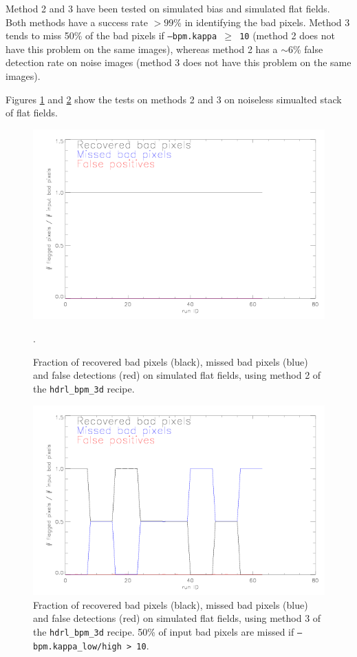 Method 2 and 3 have been tested on simulated bias and simulated flat
fields. Both methods have a success rate $> 99$\% in identifying the
bad pixels. Method 3 tends to miss 50\% of the bad pixels if
{\tt --bpm.kappa $\geq$ 10} (method 2 does not have this problem on
the same images), whereas method 2 has a $\sim 6$\% false detection
rate on noise images (method 3 does not have this problem on the same
images).

Figures \ref{fig:stack_m2} and \ref{fig:stack_m3} show the tests on
methods 2 and 3 on noiseless simualted stack of flat fields.


\begin{figure}
 \subfigure
\includegraphics[width=17cm]{figures/recovered_bad_pixels_3d_m2.png}
 \caption{Fraction of recovered bad pixels (black), missed bad pixels
   (blue) and false detections (red) on simulated flat fields, using method 2 of the {\tt hdrl\_bpm\_3d} recipe.}.
 \label{fig:stack_m2}
\end{figure}


\begin{figure}
 \subfigure
\includegraphics[width=17cm]{figures/recovered_bad_pixels_3d_m3.png}
 \caption{Fraction of recovered bad pixels (black), missed bad pixels
   (blue) and false detections (red) on simulated flat fields, using
   method 3 of the {\tt hdrl\_bpm\_3d} recipe. 50\% of input bad pixels are missed
   if {\tt --bpm.kappa\_low/high > 10}.}
\label{fig:stack_m3}
\end{figure}



